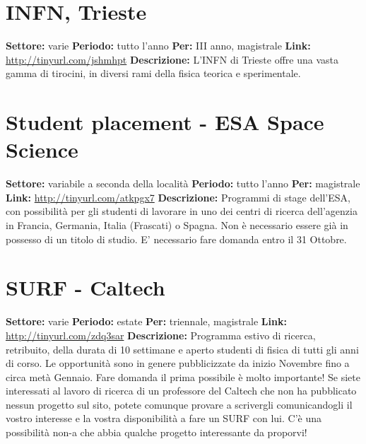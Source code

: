 \documentclass[a4paper,10pt]{article}
\begin{document}
\section{INFN, Trieste} 
\textbf{Settore:} varie\newline
\textbf{Periodo:} tutto l'anno\newline
\textbf{Per:} III anno, magistrale\newline
\textbf{Link:} \url{http://tinyurl.com/jshmhpt} \newline
\textbf{Descrizione:} L’INFN di Trieste offre una vasta gamma di tirocini, in diversi rami della fisica teorica e sperimentale. 


\section{Student placement - ESA  Space Science}  
\textbf{Settore:} variabile a seconda della località\newline
\textbf{Periodo:} tutto l'anno\newline
\textbf{Per:} magistrale\newline
\textbf{Link:} \url{http://tinyurl.com/atkpgx7} \newline
\textbf{Descrizione:} Programmi di stage dell’ESA, con possibilità per gli studenti di lavorare in uno dei centri di ricerca dell’agenzia in Francia, Germania, Italia (Frascati) o Spagna. Non è necessario essere già in possesso di un titolo di studio. E’ necessario fare domanda entro il 31 Ottobre. 

\section{SURF - Caltech}
\textbf{Settore:} varie\newline
\textbf{Periodo:} estate\newline
\textbf{Per:} triennale, magistrale\newline
\textbf{Link:} \url{http://tinyurl.com/zdq3sar} \newline
\textbf{Descrizione:} Programma estivo di ricerca, retribuito, della durata di 10 settimane e aperto studenti di fisica di tutti gli anni di corso. Le opportunità sono in genere pubblicizzate da inizio Novembre fino a circa metà Gennaio. Fare domanda il prima possibile è molto importante! Se siete interessati al lavoro di ricerca di un professore del Caltech che non ha pubblicato nessun progetto sul sito, potete comunque provare a scrivergli comunicandogli il vostro interesse e la vostra disponibilità a fare un SURF con lui. C’è una possibilità non-a che abbia qualche progetto interessante da proporvi! 
\end{document}
